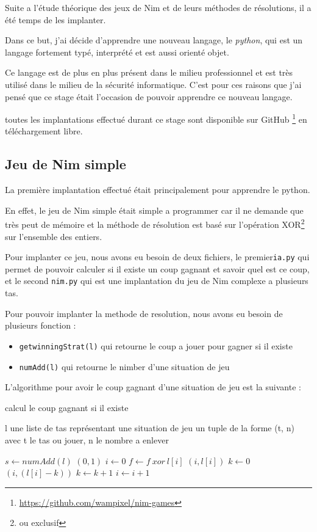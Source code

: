 Suite a l’étude théorique des jeux de Nim et de leurs méthodes de résolutions, il a été temps de les implanter.

Dans ce but, j'ai décide d'apprendre une nouveau langage, le \textit{python}, qui est un langage fortement typé, interprété et est aussi orienté objet. 

Ce langage est de plus en plus présent dans le milieu professionnel et est très utilisé dans le milieu de la sécurité informatique. C'est pour ces raisons que j'ai pensé que ce stage était l'occasion de pouvoir apprendre ce nouveau langage.

toutes les implantations effectué durant ce stage sont disponible sur GitHub \footnote{\url{https://github.com/wampixel/nim-games}} en téléchargement libre.
\subsection{Jeu de Nim simple}
\label{sub:Jeu de Nim simple}

La première implantation effectué était principalement pour apprendre le python.

En effet, le jeu de Nim simple était simple a programmer car il ne demande que très peut de mémoire et la méthode de résolution est basé sur l’opération XOR\footnote{ou exclusif} sur l'ensemble des entiers.

Pour implanter ce jeu, nous avons eu besoin de deux fichiers, le premier\texttt{ia.py} qui permet de pouvoir calculer si il existe un coup gagnant et savoir quel est ce coup, et le second \texttt{nim.py} qui est une implantation du jeu de Nim complexe a plusieurs tas.

Pour pouvoir implanter la methode de resolution, nous avons eu besoin de plusieurs fonction :
\begin{itemize}
  \item \texttt{getwinningStrat(l)} qui retourne le coup a jouer pour gagner si il existe
  \item \texttt{numAdd(l)} qui retourne le nimber d'une situation de jeu 
\end{itemize}

L'algorithme pour avoir le coup gagnant d'une situation de jeu est la suivante :
\begin{algorithm}[hbt]
  \caption{calcul le coup gagnant si il existe}
  \begin{algorithmic}
    \REQUIRE l une liste de tas représentant une situation de jeu
    \ENSURE un tuple de la forme (t, n) avec t le tas ou jouer, n le nombre a enlever
    
    \STATE $s \leftarrow numAdd(l)$
      \RETURN $(0, 1)$
    \ELSE
      \STATE $i \leftarrow 0$
        \STATE $f \leftarrow f\ xor\ l[i]$
          \RETURN $(i, l[i])$
        \ELSE
          \STATE $k \leftarrow 0$
              \RETURN $(i, (l[i] - k))$
            \ELSE
              \STATE $k \leftarrow k + 1$
            \ENDIF
          \ENDWHILE
        \ENDIF
        \STATE $i \leftarrow i + 1$
      \ENDWHILE
    \ENDIF
  \end{algorithmic}
\end{algorithm}    

